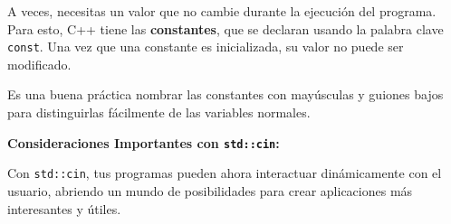 A veces, necesitas un valor que no cambie durante la ejecución del programa. Para esto, C++ tiene las \textbf{constantes}, que se declaran usando la palabra clave \texttt{const}. Una vez que una constante es inicializada, su valor no puede ser modificado.



Es una buena práctica nombrar las constantes con mayúsculas y guiones bajos para distinguirlas fácilmente de las variables normales.

%
%
%
%
%
%
%
%
%
%
%

\textbf{Consideraciones Importantes con \texttt{std::cin}:}

Con \texttt{std::cin}, tus programas pueden ahora interactuar dinámicamente con el usuario, abriendo un mundo de posibilidades para crear aplicaciones más interesantes y útiles.
